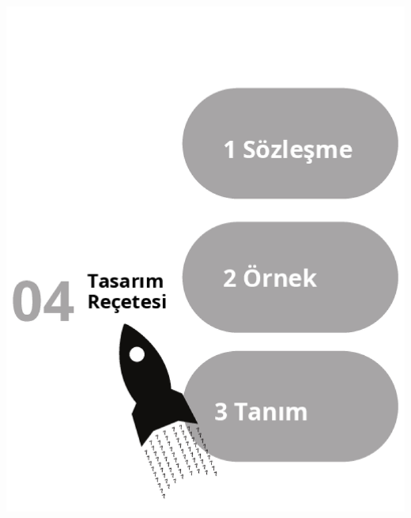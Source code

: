 \documentclass[12pt, a4paper]{article}
\begin{document}
\newpage
\includegraphics[width=1\linewidth]{cebir-bolum-04-000.png}
\end{document}
